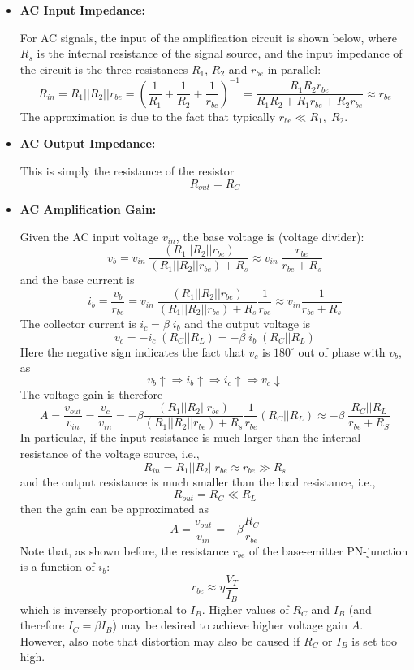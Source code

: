 \begin{itemize}
\item {\bf AC Input Impedance:} 

  For AC signals, the input of the amplification circuit is shown below, 
  where $R_s$ is the internal resistance of the signal source, and the 
  input impedance of the circuit is the three resistances $R_1$, $R_2$ and 
  $r_{be}$ in parallel:
  \[	
  R_{in}=R_1||R_2||r_{be}
  =\left(\frac{1}{R_1}+\frac{1}{R_2}+\frac{1}{r_{be}}\right)^{-1}
  =\frac{R_1 R_2 r_{be}}{R_1R_2+R_1r_{be}+R_2r_{be}}\approx r_{be}	
  \]
  The approximation is due to the fact that typically $r_{be}\ll R_1,\;R_2$.
\item {\bf AC Output Impedance:} 

  This is simply the resistance of the resistor 
  \[	R_{out}=R_C	\]

\item {\bf AC Amplification Gain:} 

  Given the AC input voltage $v_{in}$, the base voltage is (voltage divider):
  \[
  v_b=v_{in}\; \frac{(R_1||R_2||r_{be})}{(R_1||R_2||r_{be})+R_s}
  \approx v_{in}\;\frac{r_{be}}{r_{be}+R_s}	
  \]
  and the base current is
  \[
  i_b=\frac{v_b}{r_{be}}
  =v_{in}\;\frac{(R_1||R_2||r_{be})}{(R_1||R_2||r_{be})+R_s}\frac{1}{r_{be}}
  \approx v_{in}\frac{1}{r_{be}+R_s}
  \]
  The collector current is $i_c=\beta \;i_b$ and the output voltage is
  \[
  v_c=-i_c\;(R_C||R_L)=-\beta\;i_b\;(R_C||R_L)	
  \]
  Here the negative sign indicates the fact that $v_c$ is $180^\circ$ out of
  phase with $v_b$, as 
  \[	
  v_b \uparrow \Longrightarrow i_b \uparrow \Longrightarrow i_c \uparrow
  \Longrightarrow v_c \downarrow	
  \]
  The voltage gain is therefore
  \[
  A=\frac{v_{out}}{v_{in}}=\frac{v_c}{v_{in}}=
  -\beta \frac{(R_1||R_2||r_{be})}{(R_1||R_2||r_{be})+R_s}
  \frac{1}{r_{be}}(R_C||R_L)\approx -\beta\;\frac{R_C||R_L}{r_{be}+R_S}\]
  In particular, if the input resistance is much larger than the internal 
  resistance of the voltage source, i.e., 
  \[	
  R_{in}=R_1||R_2||r_{be} \approx r_{be} \gg  R_s	
  \]
  and the output resistance is much smaller than the load resistance, i.e.,
  \[
  R_{out}=R_C \ll R_L	
  \]
  then the gain can be approximated as
  \[
  A=\frac{v_{out}}{v_{in}}=-\beta \frac{R_C}{r_{be}}	
  \]
  Note that, as shown before, the resistance $r_{be}$ of the base-emitter 
  PN-junction is a function of $i_b$:
  \[
  r_{be}\approx \eta\frac{V_T}{I_B}
  \]
  which is inversely proportional to $I_B$. Higher values of $R_C$ and 
  $I_B$ (and therefore $I_C=\beta I_B$) may be desired to achieve higher
  voltage gain $A$. However, also note that distortion may also be caused 
  if $R_C$ or $I_B$ is set too high.
  
\end{itemize}

